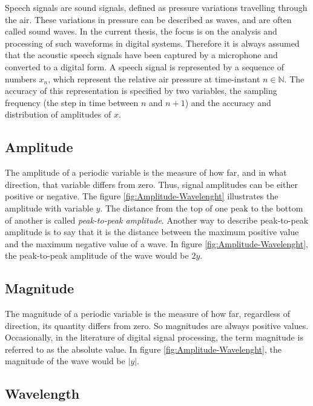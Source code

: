 Speech signals are sound signals, defined as pressure variations travelling through the air. These variations in pressure can be described as waves, and are often called sound waves. In the current thesis, the focus is on the analysis and processing of such waveforms in digital systems. Therefore it is always assumed that the acoustic speech signals have been captured by a microphone and converted to a digital form.
\newline
\newline
A speech signal is represented by a sequence of numbers $x_n$, which represent the relative air pressure at time-instant $n\in{\mathbb N}$. The accuracy of this representation is specified by two variables, the sampling frequency (the step in time between $n$ and $n+1$) and the accuracy and distribution of amplitudes of $x$.

\subsection{Amplitude}
\label{sub:Amplitude}

The amplitude of a periodic variable is the measure of how far, and in what direction, that variable differs from zero. Thus, signal amplitudes can be either positive or negative. The figure \ref{fig:Amplitude-Wavelenght} illustrates the amplitude with variable $y$. 
\newline
\newline
The distance from the top of one peak to the bottom of another is called \textit{peak-to-peak amplitude}. Another way to describe peak-to-peak amplitude is to say that it is the distance between the maximum positive value and the maximum negative value of a wave. In figure \ref{fig:Amplitude-Wavelenght}, the peak-to-peak amplitude of the wave would be $2y$.

\subsection{Magnitude}
\label{sub:Magnitude}

The magnitude of a periodic variable is the measure of how far, regardless of direction, its quantity differs from zero. So magnitudes are always positive values. Occasionally, in the literature of digital signal processing, the term magnitude is referred to as the absolute value. In figure \ref{fig:Amplitude-Wavelenght}, the magnitude of the wave would be $|y|$.

\subsection{Wavelength}
\label{sub:Wavelength}


